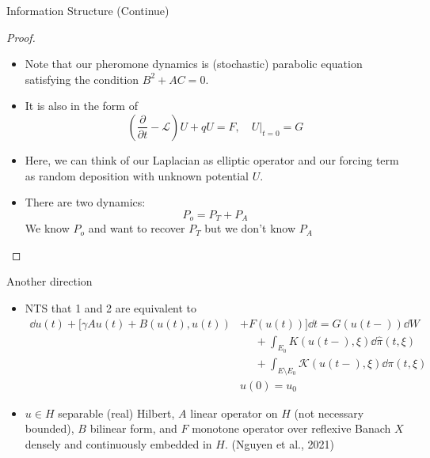 \documentclass[10pt]{beamer}
\begin{document}
\begin{frame}{Information Structure (Continue)}
    \begin{proof}
        \begin{itemize}
        \item Note that our pheromone dynamics is (stochastic) parabolic equation satisfying the condition $B^2 + AC = 0$.
        \item It is also in the form of
        \begin{equation}
        \left(\dfrac{\partial}{\partial t}-\mathcal{L}\right) U + qU = F, \quad \left.U\right|_{t=0} = G    
        \end{equation}
        \item Here, we can think of our Laplacian as elliptic operator and our forcing term as random deposition with unknown potential $U$.
        \item There are two dynamics:
        \[
        P_o = P_T + P_A
        \]
        We know $P_o$ and want to recover $P_T$ but we don't know $P_A$
    \end{itemize}
    \end{proof}
    \end{frame}
    \begin{frame}{Another direction}
        \begin{itemize}
            \item NTS that 1 and 2 are equivalent to
            \begin{align*}
            \dd u(t) + [\gamma Au(t)+B(u(t),u(t)) &+F(u(t))]\dd t = G(u(t-))\dd W \\
            &\phantom{=}+ \int_{E_0}K(u(t-),\xi)
            \dd \hat{\pi}(t,\xi)\\
            &\phantom{=}+ \int_{E\setminus E_0}\mathcal{K}(u(t-),\xi)\dd\pi(t,\xi)\\
            &u(0) = u_0
            \end{align*}
            \item $u\in H$ separable (real) Hilbert, $A$ linear operator on $H$ (not necessary bounded), $B$ bilinear form, and $F$ monotone operator over reflexive Banach $X$ densely and continuously embedded in $H$. (Nguyen et al., 2021)
        \end{itemize}
    \end{frame}
\end{document}
